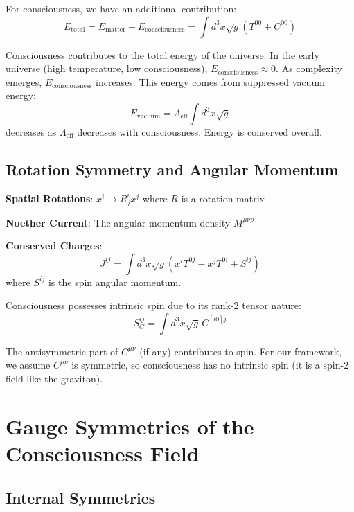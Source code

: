 For consciousness, we have an additional contribution:
\begin{equation}
E_{\text{total}} = E_{\text{matter}} + E_{\text{consciousness}} = \int d^3x \sqrt{g} \left( T^{00} + C^{00} \right)
\end{equation}

\begin{keyidea}
Consciousness contributes to the total energy of the universe. In the early universe (high temperature, low consciousness), $E_{\text{consciousness}} \approx 0$. As complexity emerges, $E_{\text{consciousness}}$ increases. This energy comes from suppressed vacuum energy:
\begin{equation}
E_{\text{vacuum}} = \Lambda_{\text{eff}} \int d^3x \sqrt{g}
\end{equation}
decreases as $\Lambda_{\text{eff}}$ decreases with consciousness. Energy is conserved overall.
\end{keyidea}

\subsection{Rotation Symmetry and Angular Momentum}

\textbf{Spatial Rotations}: $x^i \to R^i_j x^j$ where $R$ is a rotation matrix

\textbf{Noether Current}: The angular momentum density $M^{\mu\nu\rho}$

\textbf{Conserved Charges}:
\begin{equation}
J^{ij} = \int d^3x \sqrt{g} \left( x^i T^{0j} - x^j T^{0i} + S^{ij} \right)
\end{equation}
where $S^{ij}$ is the spin angular momentum.

Consciousness possesses intrinsic spin due to its rank-2 tensor nature:
\begin{equation}
S^{ij}_C = \int d^3x \sqrt{g} \, C^{[i0]j}
\end{equation}

The antisymmetric part of $C^{\mu\nu}$ (if any) contributes to spin. For our framework, we assume $C^{\mu\nu}$ is symmetric, so consciousness has no intrinsic spin (it is a spin-2 field like the graviton).

\section{Gauge Symmetries of the Consciousness Field}

\subsection{Internal Symmetries}

